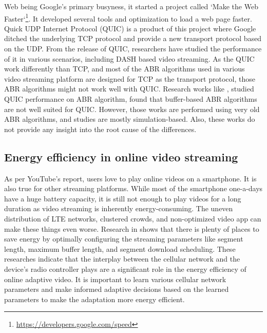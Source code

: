 Web being Google's primary busyness, it started a project called `Make the Web Faster`\footnote{\url{https://developers.google.com/speed}}. It developed several tools and optimization to load a web page faster. Quick UDP Internet Protocol (QUIC)\cite{langley2017quic} is a product of this project where Google ditched the underlying TCP protocol and provide a new transport protocol based on the UDP. From the release of QUIC, researchers have studied the performance of it in various scenarios, including DASH based video streaming. As the QUIC work differently than TCP, and most of the ABR algorithms used in various video streaming platform are designed for TCP as the transport protocol, those ABR algorithms might not work well with QUIC. Research works like \cite{bhat2018improving,van2018empirical}, studied QUIC performance on ABR algorithm, found that buffer-based ABR algorithms are not well suited for QUIC. However, those works are performed using very old ABR algorithms, and studies are mostly simulation-based. Also, these works do not provide any insight into the root cause of the differences.

\subsection{Energy efficiency in online video streaming}
As per YouTube's report, users love to play online videos on a smartphone. It is also true for other streaming platforms. While most of the smartphone one-a-days have a huge battery capacity, it is still not enough to play videos for a long duration as video streaming is inherently energy-consuming. The uneven distribution of LTE networks, clustered crowds, and non-optimized video app can make these things even worse. Research in \cite{10.1145/2910018.2910656} shows that there is plenty of places to save energy by optimally configuring the streaming parameters like segment length, maximum buffer length, and segment download scheduling. These researches indicate that the interplay between the cellular network and the device's radio controller plays are a significant role in the energy efficiency of online adaptive video. It is important to learn various cellular network parameters and make informed adaptive decisions based on the learned parameters to make the adaptation more energy efficient.

